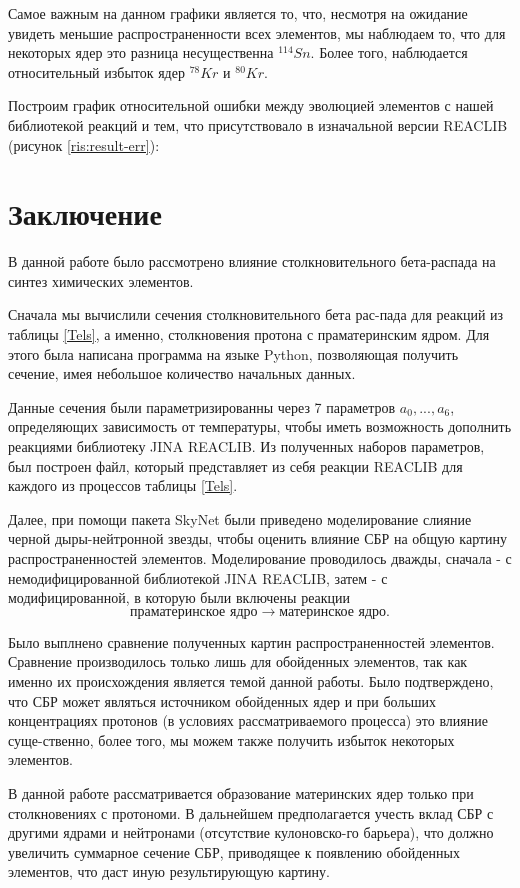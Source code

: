 \documentclass[14pt, a4paper]{article}
\numberwithin{figure}{section}
\numberwithin{equation}{section}
\begin{document}
Самое важным на данном графики является то, что, несмотря на ожидание увидеть меньшие распространенности всех элементов, мы наблюдаем то, что для некоторых ядер это разница несущественна $^{114}Sn$. Более того, наблюдается относительный избыток ядер $^{78}Kr$ и $^{80}Kr$.

Построим график относительной ошибки между эволюцией элементов с нашей библиотекой реакций и тем, что присутствовало в изначальной версии REACLIB (рисунок \ref{ris:result-err}):

\section*{\centering Заключение}
В данной работе было рассмотрено влияние столкновительного бета-распада на синтез химических элементов.

Сначала мы вычислили сечения столкновительного бета рас-пада для реакций из таблицы \ref{Tels}, а именно, столкновения протона с праматеринским ядром. Для этого была написана программа на языке Python, позволяющая получить сечение, имея небольшое количество начальных данных.

Данные сечения были параметризированны через 7 параметров $a_0, ..., a_6$, определяющих зависимость от температуры, чтобы иметь возможность дополнить реакциями библиотеку JINA REACLIB. Из полученных наборов параметров, был построен файл, который представляет из себя реакции REACLIB для каждого из процессов таблицы \ref{Tels}.


Далее, при помощи пакета SkyNet были приведено моделирование слияние черной дыры-нейтронной звезды, чтобы оценить влияние СБР на общую картину распространенностей элементов. Моделирование проводилось дважды, сначала - с немодифицированной библиотекой JINA REACLIB, затем - с модифицированной, в которую были включены реакции $$\text{праматеринское ядро} \to \text{материнское ядро}.$$

Было выплнено сравнение полученных картин распространенностей элементов.  Сравнение производилось только лишь для обойденных элементов, так как именно их происхождения является темой данной работы. Было подтверждено, что СБР может являться источником обойденных ядер и при больших концентрациях протонов (в условиях рассматриваемого процесса) это влияние суще-ственно, более того, мы можем также получить избыток некоторых элементов.

В данной работе рассматривается образование материнских ядер только при столкновениях с протономи. В дальнейшем предполагается учесть вклад СБР с другими ядрами и нейтронами (отсутствие кулоновско-го барьера), что должно увеличить суммарное сечение СБР, приводящее к появлению обойденных элементов, что даст иную результирующую картину.

\newpage
{}


\end{document}
